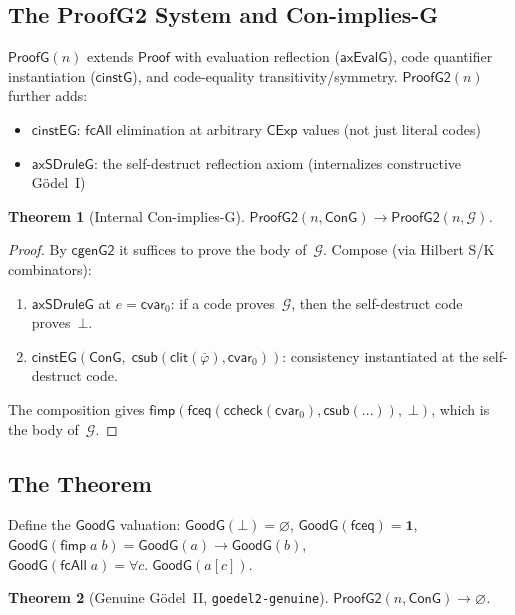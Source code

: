 \documentclass[11pt]{article}
\newtheorem{theorem}{Theorem}[section]
\newcommand{\CExp}{\mathsf{CExp}}
\newcommand{\Proof}{\mathsf{Proof}}
\newcommand{\csub}{\mathsf{csub}}
\newcommand{\clit}{\mathsf{clit}}
\newcommand{\ccheck}{\mathsf{ccheck}}
\newcommand{\cvar}{\mathsf{cvar}}
\newcommand{\fbot}{\bot}
\newcommand{\fimp}{\mathsf{fimp}}
\newcommand{\fceq}{\mathsf{fceq}}
\newcommand{\fcAll}{\mathsf{fcAll}}
\newcommand{\GS}{\mathcal{G}}
\begin{document}
\subsection{The ProofG2 System and Con-implies-G}

$\mathsf{ProofG}(n)$ extends $\Proof$ with evaluation reflection
($\mathsf{axEvalG}$), code quantifier instantiation ($\mathsf{cinstG}$),
and code-equality transitivity/symmetry. $\mathsf{ProofG2}(n)$ further
adds:
\begin{itemize}[nosep]
\item $\mathsf{cinstEG}$: $\fcAll$ elimination at arbitrary $\CExp$
  values (not just literal codes)
\item $\mathsf{axSDruleG}$: the self-destruct reflection axiom
  (internalizes constructive G\"odel~I)
\end{itemize}

\begin{theorem}[Internal Con-implies-G]
  $\mathsf{ProofG2}(n, \mathsf{ConG}) \to
   \mathsf{ProofG2}(n, \GS)$.
\end{theorem}

\begin{proof}
  By $\mathsf{cgenG2}$ it suffices to prove the body of~$\GS$.
  Compose (via Hilbert S/K combinators):
  \begin{enumerate}[nosep]
  \item $\mathsf{axSDruleG}$ at $e = \cvar_0$: if a code proves~$\GS$,
    then the self-destruct code proves~$\fbot$.
  \item $\mathsf{cinstEG}(\mathsf{ConG},\;
    \csub(\clit(\overline\varphi), \cvar_0))$:
    consistency instantiated at the self-destruct code.
  \end{enumerate}
  The composition gives $\fimp(\fceq(\ccheck(\cvar_0),
  \csub(\ldots)),\; \fbot)$, which is the body of~$\GS$.
\end{proof}

\subsection{The Theorem}

Define the $\mathsf{GoodG}$ valuation:
$\mathsf{GoodG}(\fbot) = \varnothing$,
$\mathsf{GoodG}(\fceq) = \mathbf{1}$,
$\mathsf{GoodG}(\fimp\; a\; b) = \mathsf{GoodG}(a) \to \mathsf{GoodG}(b)$,
$\mathsf{GoodG}(\fcAll\; a) = \forall c.\; \mathsf{GoodG}(a[c])$.

\begin{theorem}[Genuine G\"odel~II, \texttt{goedel2-genuine}]
  \label{thm:genuine}
  $\mathsf{ProofG2}(n, \mathsf{ConG}) \to \varnothing$.
\end{theorem}
\end{document}
